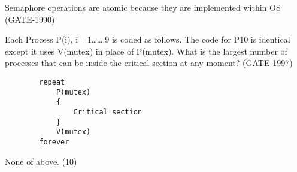 
\begin{questyle}

  \question  Semaphore operations are atomic because they are implemented within OS \fillin[] (GATE-1990)

  \end{questyle}




\begin{questyle}

  \question  Each Process P(i), i= 1…….9 is coded as follows. The code for P10 is identical except it
            uses V(mutex) in place of P(mutex). What is the largest number of processes that can be inside
            the critical section at any moment? (GATE-1997)

    \begin{lstlisting}
        repeat
            P(mutex)
            {
                Critical section
            }
            V(mutex)
        forever
    \end{lstlisting}

  \begin{oneparchoices}
    \correctchoice None of above. (10)
  \end{oneparchoices}

  \end{questyle}


